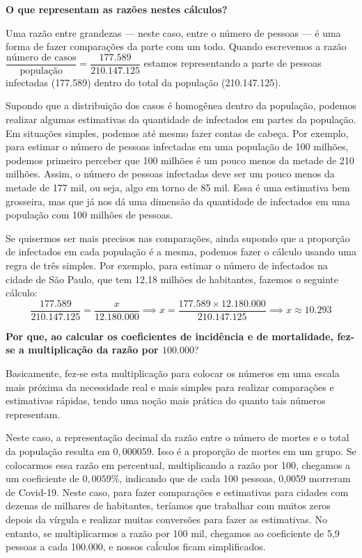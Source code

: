 \textbf{O que representam as razões nestes cálculos?}

Uma razão entre grandezas --- neste caso, entre o número de pessoas --- é uma forma de fazer comparações da parte com um todo. Quando escrevemos a razão $\dfrac{\text{número de casos}}{\text{população}} = \dfrac{{177.589}}{{210.147.125}}$ estamos representando a parte de pessoas infectadas (177.589) dentro do total da população (210.147.125).

Supondo que a distribuição dos casos é homogênea dentro da população, podemos realizar algumas estimativas da quantidade de infectados em partes da população. Em situações simples, podemos até mesmo fazer contas de cabeça. Por exemplo, para estimar o número de pessoas infectadas em uma população de 100 milhões, podemos primeiro perceber que 100 milhões é um pouco menos da metade de 210 milhões. Assim, o número de pessoas infectadas deve ser um pouco menos da metade de 177 mil, ou seja, algo em torno de 85 mil. Essa é uma estimativa bem grosseira, mas que já nos dá uma dimensão da quantidade de infectados em uma população com 100 milhões de pessoas.


Se quisermos ser mais precisos nas comparações, ainda supondo que a proporção de infectados em cada população é a mesma, podemos fazer o cálculo usando uma regra de três simples. Por exemplo, para estimar o número de infectados na cidade de São Paulo, que tem 12,18 milhões de habitantes, fazemos o seguinte cálculo:
\begin{equation*}
\frac{177.589}{210.147.125}=\frac{x}{12.180.000}\implies x=\frac{177.589\times 12.180.000}{210.147.125}\implies x\approx 10.293
\end{equation*}

\textbf{Por que, ao calcular os coeficientes de incidência e de mortalidade, fez-se a multiplicação da razão por $100.000$}?

Basicamente, fez-se esta multiplicação para colocar os números em uma escala mais próxima da necessidade real e mais simples para realizar comparações e estimativas rápidas, tendo uma noção mais prática do quanto tais números representam.

Neste caso, a representação decimal da razão entre o número de mortes e o total da população resulta em $0{,}000059$. Isso é a proporção de mortes em um grupo. Se colocarmos essa razão em percentual, multiplicando a razão por 100, chegamos a um coeficiente de $0{,}0059\%$, indicando que de cada 100 pessoas, 0,0059 morreram de Covid-19. Neste caso, para fazer comparações e estimativas para cidades com dezenas de milhares de habitantes, teríamos que trabalhar com muitos zeros depois da vírgula e realizar muitas conversões para fazer as estimativas. No entanto, se multiplicarmos a razão por 100 mil, chegamos ao coeficiente de 5,9 pessoas a cada 100.000, e nossos caĺculos ficam simplificados.

